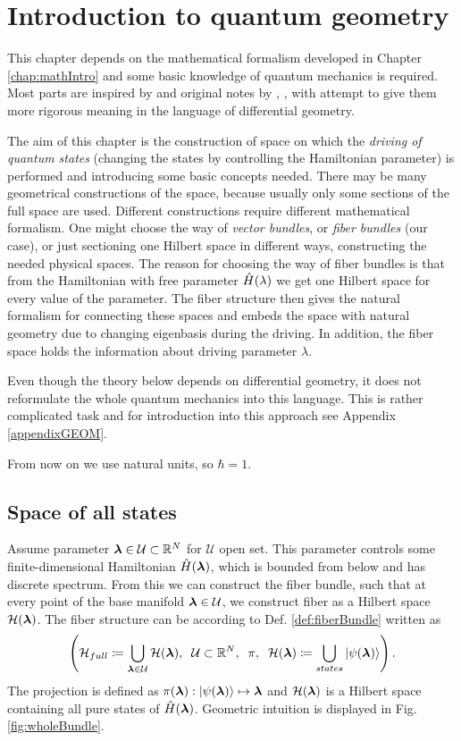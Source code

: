 \chapter{Introduction to quantum geometry}
\label{chap:driving}
This chapter depends on the mathematical formalism developed in Chapter \ref{chap:mathIntro} and some basic knowledge of quantum mechanics is required. Most parts are inspired by \citet{kolodrubez} and original notes by \citet{berry1984}, \citet{berry1989}, \citet{berry2009} with attempt to give them more rigorous meaning in the language of differential geometry. 

The aim of this chapter is the construction of space on which the \emph{driving of quantum states} (changing the states by controlling the Hamiltonian parameter) is performed and introducing some basic concepts needed. There may be many geometrical constructions of the space, because usually only some sections of the full space are used. Different constructions require different mathematical formalism. One might choose the way of \emph{vector bundles}, or \emph{fiber bundles} (our case), or just sectioning one Hilbert space in different ways, constructing the needed physical spaces. The reason for choosing the way of fiber bundles is that from the Hamiltonian with free parameter $\hat{H}(\lambda)$ we get one Hilbert space for every value of the parameter. The fiber structure then gives the natural formalism for connecting these spaces and embeds the space with natural geometry due to changing eigenbasis during the driving. In addition, the fiber space holds the information about driving parameter $\lambda$.

Even though the theory below depends on differential geometry, it does not reformulate the whole quantum mechanics into this language. This is rather complicated task and for introduction into this approach see Appendix \ref{appendixGEOM}.

From now on we use natural units, so $\hbar=1$.

\section{Space of all states}
Assume parameter ${\bm\lambda}\in\mathcal{U}\subset\mathbb{R}^N$ for $\mathcal U$ open set. This parameter controls some finite-dimensional Hamiltonian $\hat{H}({\bm\lambda})$, which is bounded from below and has discrete spectrum. From this we can construct the fiber bundle, such that at every point of the base manifold ${\bm\lambda}\in \mathcal{U}$, we construct fiber as a Hilbert space $\mathcal{H}({\bm\lambda})$. The fiber structure can be according to Def. \ref{def:fiberBundle} written as
$$\left(\mathcal{H}_{full}\coloneqq \bigcup_{{\bm\lambda}\in\mathcal U} \mathcal{H}({\bm\lambda}),\;\;\mathcal{U}\subset \mathbb{R}^N,\;\;\pi,\;\; \mathcal{H}({\bm\lambda}) \coloneqq \bigcup_{states}\ket{\psi({\bm\lambda})}  \right).$$
The projection is defined as $\pi({\bm\lambda}): \ket{\psi({\bm\lambda})}\mapsto {\bm\lambda}$ and $\mathcal{H}({\bm\lambda})$ is a Hilbert space containing all pure states of $\hat{H}({\bm\lambda})$.  Geometric intuition is displayed in Fig. \ref{fig:wholeBundle}.

